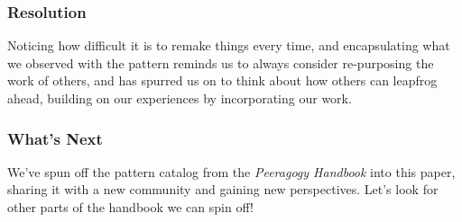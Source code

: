 \subsubsection*{Resolution} Noticing how difficult it is to remake things every time, and encapsulating what we observed with the  pattern reminds us to always consider re-purposing the work of others, and has spurred us on to think about how others can leapfrog ahead, building on our experiences by incorporating our work.

\subsubsection*{What's Next} We've spun off the pattern catalog from the \emph{Peeragogy Handbook} into this paper, sharing it with a new community and gaining new perspectives.  Let's look for other parts of the handbook we can spin off!
